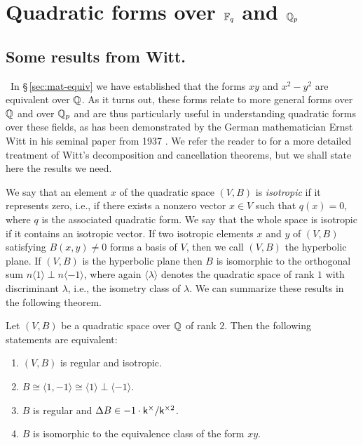 \section{Quadratic forms over \(\mathbb{F}_q\) and \(\mathbb{Q}_p\)}

\subsection{Some results from Witt.}~In \S\,\ref{sec:mat-equiv} we have established that the forms \(xy\) and \(x^2 - y^2\) are equivalent over \(\mathbb{Q}\). As it turns out, these forms relate to more general forms over \(\mathbb{Q}\) and over \(\mathbb{Q}_p\) and are thus particularly useful in understanding quadratic forms over these fields, as has been demonstrated by the German mathematician Ernst Witt in his seminal paper from 1937 \cite{witt1937theorie}. We refer the reader to \cite{lam1973quadratic} for a more detailed treatment of Witt's decomposition and cancellation theorems, but we shall state here the results we need.\label{sec:results-from-witt}

We say that an element \(x\) of the quadratic space \((V,B)\) is \emph{isotropic} if it represents zero, i.e., if there exists a nonzero vector \(x \in V\) such that \(q(x) = 0\), where \(q\) is the associated quadratic form. We say that the whole space is isotropic if it contains an isotropic vector. If two isotropic elements \(x\) and \(y\) of \((V,B)\) satisfying \(B(x,y) \neq 0\) forms a basis of \(V\), then we call \((V, B)\) the hyperbolic plane. If \((V,B)\) is the hyperbolic plane then \(B\) is isomorphic to the orthogonal sum \(n\langle 1 \rangle \perp n \langle -1 \rangle\), where again \(\langle \lambda \rangle\) denotes the quadratic space of rank \(1\) with discriminant \(\lambda\), i.e., the isometry class of \(\lambda\). We can summarize these results in the following theorem.

\begin{theoremx}\label{thm:regular-witt}
    Let \((V, B)\) be a quadratic space over \(\mathbb{Q}\) of rank \(2\). Then the following statements are equivalent:

    \smallskip

    \begin{enumerate}[nosep, label=(\alph*)]
        \item \((V, B)\) is regular and isotropic.
        \item \(B \cong \langle 1, -1 \rangle \cong \langle 1 \rangle \perp \langle -1 \rangle\).
        \item \(B\) is regular and \({\Delta} B \in -1 \cdot \mathsf{k}^{\times}/\mathsf{k}^{\times2}\).
        \item \(B\) is isomorphic to the equivalence class of the form \(xy\).
    \end{enumerate}
\end{theoremx}

